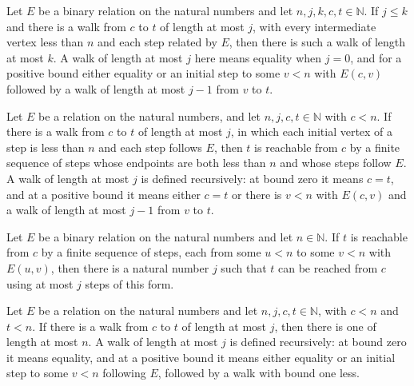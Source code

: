 \begin{lemma}
\label{Complexity.walkLe_mono}
\leanok
{}
Let $E$ be a binary relation on the natural numbers and let $n,j,k,c,t\in\mathbb{N}$. If
$j\le k$ and there is a walk from $c$ to $t$ of length at most $j$, with every
intermediate vertex less than $n$ and each step related by $E$, then there is such a
walk of length at most $k$. A walk of length at most $j$ here means equality when $j=0$,
and for a positive bound either equality or an initial step to some $v<n$ with $E(c,v)$
followed by a walk of length at most $j-1$ from $v$ to $t$.
\end{lemma}

\begin{lemma}
\label{Complexity.walkLe_reach}
\leanok
{}
Let $E$ be a relation on the natural numbers, and let $n,j,c,t\in\mathbb{N}$ with $c<n$.
If there is a walk from $c$ to $t$ of length at most $j$, in which each initial vertex
of a step is less than $n$ and each step follows $E$, then $t$ is reachable from $c$ by
a finite sequence of steps whose endpoints are both less than $n$ and whose steps follow
$E$. A walk of length at most $j$ is defined recursively: at bound zero it means $c=t$,
and at a positive bound it means either $c=t$ or there is $v<n$ with $E(c,v)$ and a walk
of length at most $j-1$ from $v$ to $t$.
\end{lemma}

\begin{lemma}
\label{Complexity.exists_walkLe}
\leanok
{}
Let $E$ be a binary relation on the natural numbers and let $n\in\mathbb{N}$. If $t$ is
reachable from $c$ by a finite sequence of steps, each from some $u<n$ to some $v<n$
with $E(u,v)$, then there is a natural number $j$ such that $t$ can be reached from $c$
using at most $j$ steps of this form.
\end{lemma}

\begin{lemma}
\label{Complexity.walkLe_short}
\leanok
{}
Let $E$ be a relation on the natural numbers and let $n,j,c,t\in\mathbb{N}$, with $c<n$
and $t<n$. If there is a walk from $c$ to $t$ of length at most $j$, then there is one
of length at most $n$. A walk of length at most $j$ is defined recursively: at bound
zero it means equality, and at a positive bound it means either equality or an initial
step to some $v<n$ following $E$, followed by a walk with bound one less.
\end{lemma}

